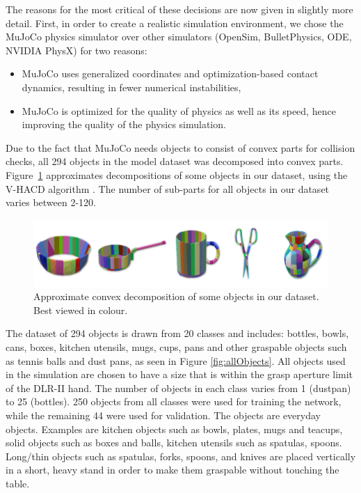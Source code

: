 The reasons for the most critical of these decisions are now given in slightly more detail. First, in order to create a realistic simulation environment, we chose the MuJoCo \cite{MuJoCo} physics simulator over other simulators (OpenSim, BulletPhysics, ODE, NVIDIA PhysX) for two reasons: 
\begin{itemize}
\item MuJoCo uses generalized coordinates and optimization-based contact dynamics, resulting in fewer numerical instabilities,
\item MuJoCo is optimized for the quality of physics as well as its speed, hence improving the quality of the physics simulation.
\end{itemize}

Due to the fact that MuJoCo needs objects to consist of convex parts for collision checks, all 294 objects in the model dataset was decomposed into convex parts. Figure~\ref{fig:objectDecomposition} approximates decompositions of some objects in our dataset, using the V-HACD algorithm \cite{V-HACD}. The number of sub-parts for all objects in our dataset varies between 2-120. 
\begin{figure}
  \includegraphics[width=\linewidth]{images/decomposition.png}
  \caption{Approximate convex decomposition of some objects in our dataset. Best viewed in colour.}
  \label{fig:objectDecomposition}
\end{figure}
The dataset of 294 objects is drawn from 20 classes and includes: bottles, bowls, cans, boxes, kitchen utensils, mugs, cups, pans and other graspable objects such as tennis balls and dust pans, as seen in Figure \ref{fig:allObjects}. All objects used in the simulation are chosen to have a size that is within the grasp aperture limit of the DLR-II hand. The number of objects in each class varies from 1 (dustpan) to 25 (bottles). 250 objects from all classes were used for training the network, while the remaining 44 were used for validation. The objects are everyday objects. Examples are kitchen objects such as bowls, plates, mugs and teacups, solid objects such as boxes and balls, kitchen utensils such as spatulas, spoons. Long/thin objects such as spatulas, forks, spoons, and knives are placed vertically in a short, heavy stand in order to make them graspable without touching the table. 

